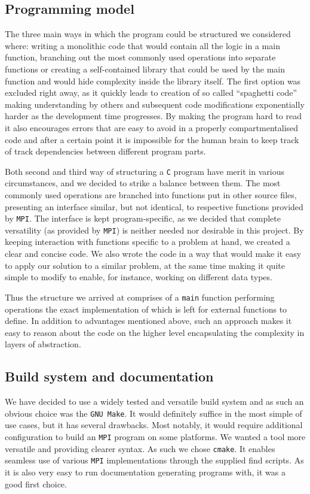 \documentclass[11pt,a4paper]{article}
\begin{document}
\subsection{Programming model}
\label{sec:model}
The three main ways in which the program could be structured we considered where: writing a monolithic code that would contain all the logic in a main function, branching out the most commonly used operations into separate functions or creating a self-contained library that could be used by the main function and would hide complexity inside the library itself.
The first option was excluded right away, as it quickly leads to creation of so called ``spaghetti code'' making understanding by others and subsequent code modifications exponentially harder as the development time progresses. 
By making the program hard to read it also encourages errors that are easy to avoid in a properly compartmentalised code and after a certain point it is impossible for the human brain to keep track of track dependencies between different program parts.

Both second and third way of structuring a \texttt{C} program have merit in various circumstances, and we decided to strike a balance between them. 
The most commonly used operations are branched into functions put in other source files, presenting an interface similar, but not identical, to respective functions provided by \texttt{MPI}.
The interface is kept program-specific, as we decided that complete versatility (as provided by \texttt{MPI}) is neither needed nor desirable in this project. 
By keeping interaction with functions specific to a problem at hand, we created a clear and concise code.
We also wrote the code in a way that would make it easy to apply our solution to a similar problem, at the same time making it quite simple to modify to enable, for instance, working on different data types.

Thus the structure we arrived at comprises of a \texttt{main} function performing operations the exact implementation of which is left for external functions to define. 
In addition to advantages mentioned above, such an approach makes it easy to reason about the code on the higher level encapsulating the complexity in layers of abstraction.

\subsection{Build system and documentation}
We have decided to use a widely tested and versatile build system and as such an obvious choice was the \texttt{GNU Make}. 
It would definitely suffice in the most simple of use cases, but it has several drawbacks. 
Most notably, it would require additional configuration to build an \texttt{MPI} program on some platforms. 
We wanted a tool more versatile and providing clearer syntax.
As such we chose \texttt{cmake}. 
It enables seamless use of various \texttt{MPI} implementations through the supplied find scripts. 
As it is also very easy to run documentation generating programs with, it was a good first choice.
\end{document}
